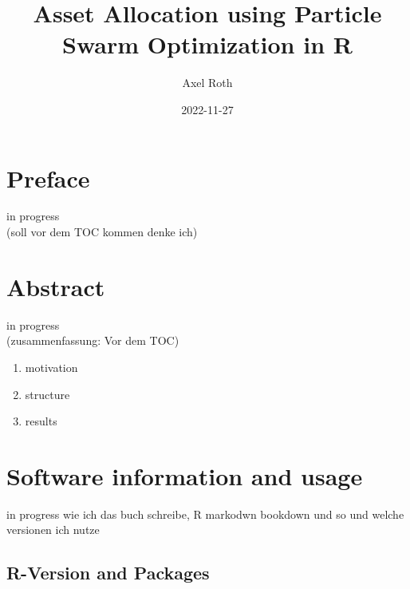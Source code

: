 \documentclass[
  oneside]{book}
\title{Asset Allocation using Particle Swarm Optimization in R}
\author{Axel Roth}
\date{2022-11-27}
\begin{document}
\maketitle

{
\setcounter{tocdepth}{1}
\tableofcontents
}
\hypertarget{preface}{%
\chapter*{Preface}\label{preface}}

\renewcommand{\chaptermark}[1]{\markboth{\uppercase{#1}}{\uppercase{#1}}}

\textbar\textbar\textbar in progress\textbar\textbar\textbar{}\\
(soll vor dem TOC kommen denke ich)

\renewcommand{\chaptermark}[1]{\markboth{\uppercase{\thechapter. \ #1}}{}}

\hypertarget{abstract}{%
\chapter*{Abstract}\label{abstract}}

\textbar\textbar\textbar in progress\textbar\textbar\textbar{}\\
(zusammenfassung: Vor dem TOC)

\begin{enumerate}
\def\labelenumi{\arabic{enumi}.}
\item
  motivation
\item
  structure
\item
  results
\end{enumerate}

\hypertarget{software-information-and-usage}{%
\chapter{Software information and usage}\label{software-information-and-usage}}

\textbar\textbar\textbar in progress\textbar\textbar\textbar{}
wie ich das buch schreibe, R markodwn bookdown und so und welche versionen ich nutze

\hypertarget{r-version-and-packages}{%
\section{R-Version and Packages}\label{r-version-and-packages}}
\end{document}
